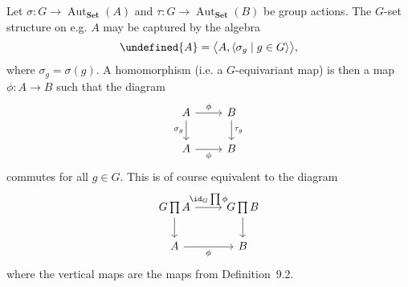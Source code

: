\documentclass[article, a4paper, 11pt, oneside]{memoir}
\let\mathfrak\undefined
\numberwithin{equation}{chapter}
\newcommand{\frakA}{\mathfrak{A}}
\newcommand{\ncat}[1]{\mathbf{#1}} %
\newcommand{\catSet}{\ncat{Set}} %
\theoremstyle{nonumberplain}
\DeclareMathOperator{\Aut}{Aut}
\begin{document}
\begin{remarkbreak}
    Let $\sigma \colon G \to \Aut_\catSet(A)$ and $\tau \colon G \to \Aut_\catSet(B)$ be group actions. The $G$-set structure on e.g. $A$ may be captured by the algebra
    \begin{equation*}
        \frakA
            = \bigl\langle A, \langle \sigma_g \mid g \in G \rangle \bigr\rangle,
    \end{equation*}
    where $\sigma_g = \sigma(g)$. A homomorphism (i.e. a $G$-equivariant map) is then a map $\phi \colon A \to B$ such that the diagram
    \begin{equation*}
        \begin{tikzcd}
            A
                \ar[r, "\phi"]
                \ar[d, "\sigma_g", swap]
            & B
                \ar[d, "\tau_g"] \\
            A
                \ar[r, "\phi", swap]
            & B
        \end{tikzcd}
    \end{equation*}
    commutes for all $g \in G$. This is of course equivalent to the diagram
    \begin{equation*}
        \begin{tikzcd}
            G \prod A
                \ar[r, "\id_G \prod \phi"]
                \ar[d]
            & G \prod B
                \ar[d] \\
            A
                \ar[r, "\phi", swap]
            & B
        \end{tikzcd}
    \end{equation*}
    where the vertical maps are the maps from Definition~9.2.
\end{remarkbreak}
\end{document}
